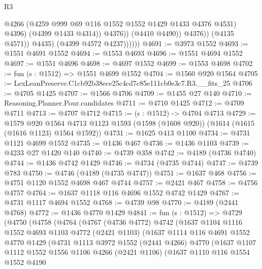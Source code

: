 \begin{lexlean}{R3}
\begin{coremodule}
                                @4266
                                (@4259 @999 @69 @116 @1552 @1552 @1429 @1433 @4376 @4531)
                                @4396)
                              (@4399 @1433 @4314))
                            @4376))
                        (@4410 @4490))
                      @4376))
                  (@4135 @4571))
                @4435)
              (@4399 @4572 @4237))))))
@4691 := @3973 @1552
@4693 := @1551 @4691 @1552
@4694 := @1553 @4693
@4696 := @1551 @4694 @1552
@4697 := @1551 @4696
@4698 := @4697 @1552
@4699 := @1553 @4698
@4702 := fun (s : @1512) => @1551 @4699 @1552
@4704 := @1560 @920 @1564
@4705 := LexLeanPreserve.C1cb92b38ece25c4cd7c85e111cb0e3c7.R3.__fits_25
@4706 := @4705 @1425
@4707 := @1566 @4706
@4709 := @1455 @27 @140
@4710 := Reasoning.Planner.Pour.candidates
@4711 := @4710 @1425
@4712 := @4709 @4711
@4713 := @4707 @4712
@4715 := (s : @1512) -> @4704 @4713
@4729 := @1579
    @920
    @1564
    @4713
    @1123
    @1593
    (@1598 (@1608 @920))
    (@1614 (@1615 (@1616 @1123) @1564 @1592))
@4731 := @1625 @413 @1100
@4734 := @4731 @1121 @4699 @1552
@4735 := @1436 @467
@4736 := @1436 @1103
@4739 := @4233 @27 @1420 @140
@4740 := @4739 @358
@4742 := @4189 (@4736 @4740)
@4744 := @1436 @4742 @1429
@4746 := @4734 (@4735 @4744)
@4747 := @4739 @783
@4750 := @4746 (@4189 (@4735 @4747))
@4751 := @1637 @468
@4756 := @4751 @1120 @1552 @4698 @467 @4744
@4757 := @2421 @467
@4758 := @4756 @4757
@4764 := @1637 @1118 @116 @4696 @1552 @4742 @1429
@4767 := @4731 @1117 @4694 @1552
@4768 := @4739 @98
@4770 := @4189 (@2441 @4768)
@4772 := @1436 @4770 @1429
@4841 := fun (s : @1512) =>
  @4729
    (@4750
      (@4758
        (@4764
          (@4767
            (@4736 @4772)
            @4742
            (@1637
              @1104
              @1116
              @1552
              @4693
              @1103
              @4772
              (@2421 @1103)
              (@1637
                @1114
                @116
                @4691
                @1552
                @4770
                @1429
                (@4731
                  @1113
                  @3972
                  @1552
                  (@2441 @4266)
                  @4770
                  (@1637
                    @1107
                    @1112
                    @1552
                    @1556
                    @1106
                    @4266
                    (@2421 @1106)
                    (@1637
                      @1110
                      @116
                      @1554
                      @1552
                      @4190

\end{coremodule}
\end{lexlean}
